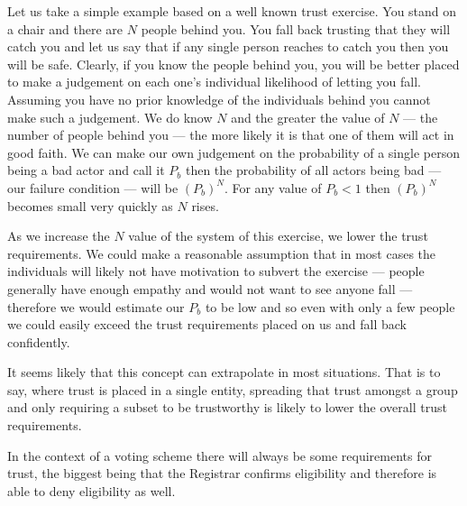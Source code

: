 Let us take a simple example based on a well known trust exercise. You stand on a chair and there are $N$ people behind you. You fall back trusting that they will catch you and let us say that if any single person reaches to catch you then you will be safe. Clearly, if you know the people behind you, you will be better placed to make a judgement on each one's individual likelihood of letting you fall. Assuming you have no prior knowledge of the individuals behind you cannot make such a judgement. We do know $N$ and the greater the value of $N$ --- the number of people behind you --- the more likely it is that one of them will act in good faith. We can make our own judgement on the probability of a single person being a bad actor and call it $P_b$ then the probability of all actors being bad --- our failure condition --- will be $(P_b)^N$. For any value of $P_b < 1$ then $(P_b)^N$ becomes small very quickly as $N$ rises.

As we increase the $N$ value of the system of this exercise, we lower the trust requirements. We could make a reasonable assumption that in most cases the individuals will likely not have motivation to subvert the exercise --- people generally have enough empathy and would not want to see anyone fall --- therefore we would estimate our $P_b$ to be low and so even with only a few people we could easily exceed the trust requirements placed on us and fall back confidently.

It seems likely that this concept can extrapolate in most situations. That is to say, where trust is placed in a single entity, spreading that trust amongst a group and only requiring a subset to be trustworthy is likely to lower the overall trust requirements.

In the context of a voting scheme there will always be some requirements for trust, the biggest being that the Registrar confirms eligibility and therefore is able to deny eligibility as well.

